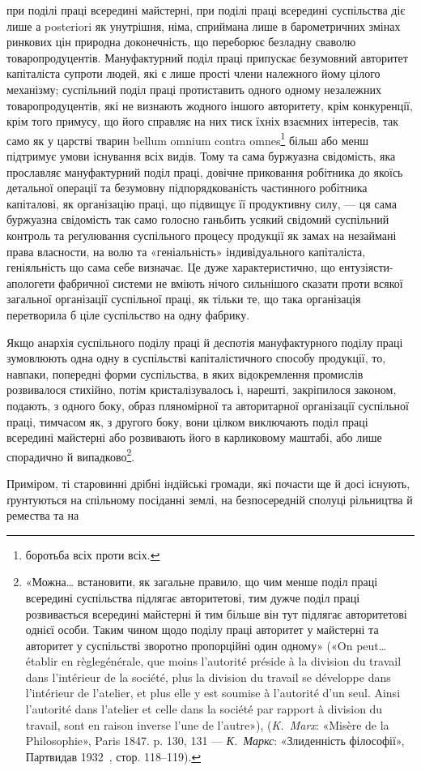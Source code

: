 \parcont{}  %
при поділі праці всередині майстерні, при поділі праці всередині
суспільства діє лише а posteriori як унутрішня, німа, сприймана
лише в барометричних змінах ринкових цін природна доконечність,
що переборює безладну сваволю товаропродуцентів. Мануфактурний
поділ праці припускає безумовний авторитет капіталіста
супроти людей, які є лише прості члени належного йому цілого
механізму; суспільний поділ праці протиставить одного одному
незалежних товаропродуцентів, які не визнають жодного іншого
авторитету, крім конкуренції, крім того примусу, що його справляє
на них тиск їхніх взаємних інтересів, так само як у царстві
тварин bellum omnium contra omnes\footnote*{
боротьба всіх проти всіх. 
} більш або менш підтримує
умови існування всіх видів. Тому та сама буржуазна свідомість,
яка прославляє мануфактурний поділ праці, довічне приковання
робітника до якоїсь детальної операції та безумовну підпорядкованість
частинного робітника капіталові, як організацію
праці, що підвищує її продуктивну силу, — ця сама буржуазна
свідомість так само голосно ганьбить усякий свідомий суспільний
контроль та реґулювання суспільного процесу продукції як замах
на незаймані права власности, на волю та «геніальність» індивідуального
капіталіста, геніяльність що сама себе визначає.
Це дуже характеристично, що ентузіясти-апологети фабричної
системи не вміють нічого сильнішого сказати проти всякої загальної
організації суспільної праці, як тільки те, що така організація
перетворила б ціле суспільство на одну фабрику.

Якщо анархія суспільного поділу праці й деспотія мануфактурного
поділу праці зумовлюють одна одну в суспільстві капіталістичного
способу продукції, то, навпаки, попередні форми
суспільства, в яких відокремлення промислів розвивалося стихійно,
потім кристалізувалось і, нарешті, закріпилося законом,
подають, з одного боку, образ пляномірної та авторитарної
організації суспільної праці, тимчасом як, з другого боку, вони
цілком виключають поділ праці всередині майстерні або розвивають
його в карликовому маштабі, або лише спорадично й випадково\footnote{
«Можна\dots{} встановити, як загальне правило, що чим менше поділ
праці всередині суспільства підлягає авторитетові, тим дужче поділ
праці розвивається всередині майстерні й тим більше він тут підлягає
авторитетові однієї особи. Таким чином щодо поділу праці авторитет
у майстерні та авторитет у суспільстві зворотно пропорційні один
одному» («On peut\dots{} établir en règlegénérale, que moins l’autorité préside
à la division du travail dans l’intérieur de la société, plus la division du
travail se développe dans l’intérieur de l’atelier, et plus elle y est soumise
à l’autorité d’un seul. Ainsi l’autorité dans l’atelier et celle dans la société
par rapport à division du travail, sont en raison inverse l’une de l’autre»),
(\emph{K.~Marx}: «Misère de la Philosophie», Paris 1847. p. 130, 131 — \emph{К.~Маркс}:
«Злиденність філософії», Партвидав 1932~, стор. 118--119).
}.

Приміром, ті старовинні дрібні індійські громади, які почасти
ще й досі існують, ґрунтуються на спільному посіданні
землі, на безпосередній сполуці рільництва й ремества та на
\parbreak{}  %
